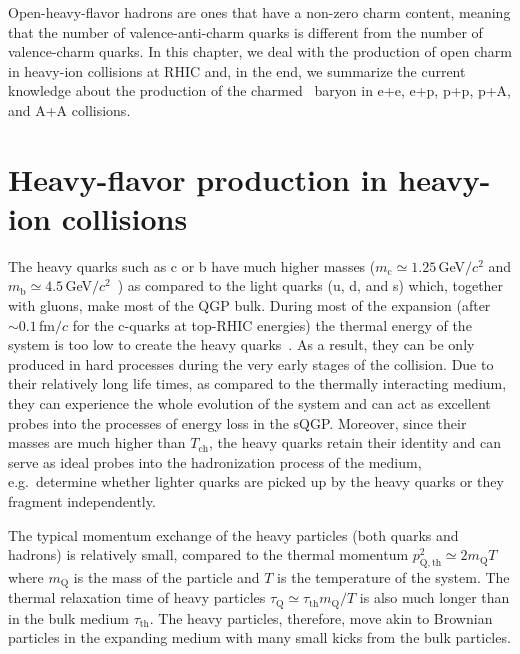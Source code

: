 Open-heavy-flavor hadrons are ones that have a non-zero charm content, meaning that the number of valence-anti-charm quarks is different from the number of valence-charm quarks. In this chapter, we deal with the production of open charm in heavy-ion collisions at RHIC and, in the end, we summarize the current knowledge about the production of the charmed \Lambdac\ baryon in e+e, e+p, p+p, p+A, and A+A collisions.

\section{Heavy-flavor production in heavy-ion collisions}

The heavy quarks such as c or b have much higher masses ($m_\mathrm{c} \simeq 1.25\,$GeV$/c^2$ and $m_\mathrm{b} \simeq 4.5\,$GeV$/c^2$~\cite{PDG}) as compared to the light quarks (u, d, and s) which, together with gluons, make most of the QGP bulk.  During most of the expansion (after $\sim 0.1\,$fm$/c$ for the c-quarks at top-RHIC energies) the thermal energy of the system is too low to create the heavy quarks~\cite{summaryHF,Prino_Rapp_HF}\@. As a result, they can be only produced in hard processes during the very early stages of the collision. Due to their relatively long life times, as compared to the thermally interacting medium, they can experience the whole evolution of the system and can act as excellent probes into the processes of energy loss in the sQGP\@. Moreover, since their masses are much higher than $T_\mathrm{ch}$, the heavy quarks retain their identity and can serve as ideal probes into the hadronization process of the medium, e.g.\ determine whether lighter quarks are picked up by the heavy quarks or they fragment independently.

The typical momentum exchange of the heavy particles (both quarks and hadrons) is relatively small, compared to the thermal momentum $p^2_\mathrm{Q,th} \simeq 2m_\mathrm{Q}T$~\cite{Prino_Rapp_HF} where $m_\mathrm{Q}$ is the mass of the particle and $T$ is the temperature of the system\@. The thermal relaxation 
time of heavy particles  $\tau_\mathrm{Q} \simeq \tau_\mathrm{th}m_\mathrm{Q}/T$ is also much longer than in the bulk medium $\tau_\mathrm{th}$\@. The heavy particles, therefore, move akin to Brownian particles in the expanding medium with many small kicks from the bulk particles.


